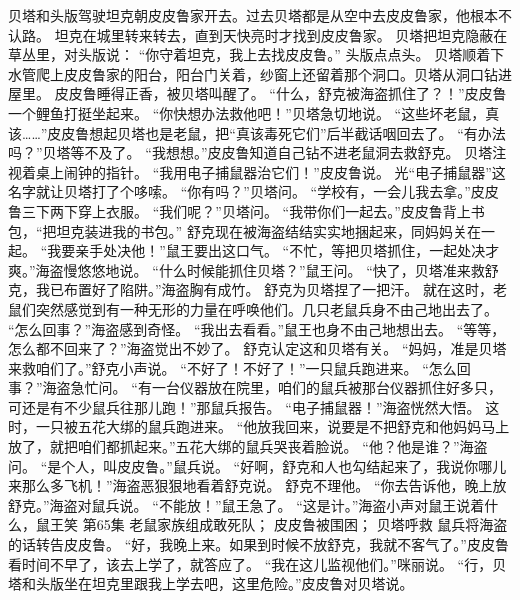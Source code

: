 \documentclass[a4paper,12pt,UTF8,twoside]{ctexbook}
\begin{document}
        贝塔和头版驾驶坦克朝皮皮鲁家开去。过去贝塔都是从空中去皮皮鲁家，他根本不认路。 
        坦克在城里转来转去，直到天快亮时才找到皮皮鲁家。 
        贝塔把坦克隐蔽在草丛里，对头版说： 
        “你守着坦克，我上去找皮皮鲁。” 
        头版点点头。 
        贝塔顺着下水管爬上皮皮鲁家的阳台，阳台门关着，纱窗上还留着那个洞口。贝塔从洞口钻进屋里。 
        皮皮鲁睡得正香，被贝塔叫醒了。 
        “什么，舒克被海盗抓住了？！”皮皮鲁一个鲤鱼打挺坐起来。 
        “你快想办法救他吧！”贝塔急切地说。 
        “这些坏老鼠，真该……”皮皮鲁想起贝塔也是老鼠，把“真该毒死它们”后半截话咽回去了。 
        “有办法吗？”贝塔等不及了。 
        “我想想。”皮皮鲁知道自己钻不进老鼠洞去救舒克。 
        贝塔注视着桌上闹钟的指针。 
        “我用电子捕鼠器治它们！”皮皮鲁说。 
        光“电子捕鼠器”这名字就让贝塔打了个哆嗦。 
        “你有吗？”贝塔问。 
        “学校有，一会儿我去拿。”皮皮鲁三下两下穿上衣服。 
        “我们呢？”贝塔问。 
        “我带你们一起去。”皮皮鲁背上书包，“把坦克装进我的书包。” 
        舒克现在被海盗结结实实地捆起来，同妈妈关在一起。 
        “我要亲手处决他！”鼠王要出这口气。 
        “不忙，等把贝塔抓住，一起处决才爽。”海盗慢悠悠地说。 
        “什么时候能抓住贝塔？”鼠王问。 
        “快了，贝塔准来救舒克，我已布置好了陷阱。”海盗胸有成竹。 
        舒克为贝塔捏了一把汗。 
        就在这时，老鼠们突然感觉到有一种无形的力量在呼唤他们。几只老鼠兵身不由己地出去了。 
        “怎么回事？”海盗感到奇怪。 
        “我出去看看。”鼠王也身不由己地想出去。 
        “等等，怎么都不回来了？”海盗觉出不妙了。 
        舒克认定这和贝塔有关。 
        “妈妈，准是贝塔来救咱们了。”舒克小声说。 
        “不好了！不好了！”一只鼠兵跑进来。 
        “怎么回事？”海盗急忙问。 
        “有一台仪器放在院里，咱们的鼠兵被那台仪器抓住好多只，可还是有不少鼠兵往那儿跑！”那鼠兵报告。 
        “电子捕鼠器！”海盗恍然大悟。 
        这时，一只被五花大绑的鼠兵跑进来。 
        “他放我回来，说要是不把舒克和他妈妈马上放了，就把咱们都抓起来。”五花大绑的鼠兵哭丧着脸说。 
        “他？他是谁？”海盗问。 
        “是个人，叫皮皮鲁。”鼠兵说。 
        “好啊，舒克和人也勾结起来了，我说你哪儿来那么多飞机！”海盗恶狠狠地看着舒克说。 
        舒克不理他。 
        “你去告诉他，晚上放舒克。”海盗对鼠兵说。 
        “不能放！”鼠王急了。 
        “这是计。”海盗小声对鼠王说着什么，鼠王笑   第65集 
        老鼠家族组成敢死队； 
        皮皮鲁被围困； 
        贝塔呼救   
        鼠兵将海盗的话转告皮皮鲁。 
        “好，我晚上来。如果到时候不放舒克，我就不客气了。”皮皮鲁看时间不早了，该去上学了，就答应了。 
        “我在这儿监视他们。”咪丽说。 
        “行，贝塔和头版坐在坦克里跟我上学去吧，这里危险。”皮皮鲁对贝塔说。 
\end{document}
